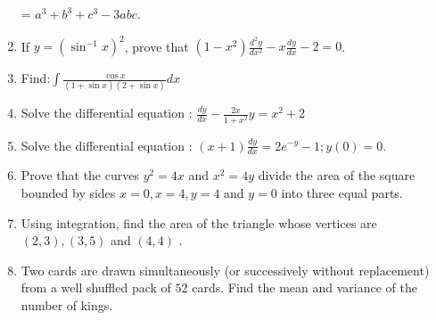 \documentclass{article}
\begin{document}
\begin{enumerate}
 = $a^3+b^3+c^3-3abc$.
\item If $y=(\sin^{-1}x)^2$, prove that $(1-x^2)\frac{d^2y}{dx^2}-x \frac{dy}{dx}-2=0$.
\item Find:$\int\frac{\cos x}{(1 + \sin x)(2 + \sin x)} dx$
\item Solve the differential equation : $\frac{dy}{dx} - \frac{2x}{1+x^2}y = x^2 + 2$
\item Solve the differential equation : $(x+1)\frac{dy}{dx} =2e^{-y}-1;y(0)=0$.
\item Prove that the curves $y^2 = 4x$ and $x^2 = 4y$ divide the area of the square bounded by sides $x = 0, x = 4, y = 4$ and $y = 0$ into three equal parts. 
\item Using integration, find the area of the triangle whose vertices are $(2, 3), (3, 5)$ and $(4, 4)$ .
\item Two cards are drawn simultaneously (or successively without replacement) from a
well shuffled pack of $52$ cards. Find the mean and variance of the number of kings.
\end{enumerate}
\end{document}
